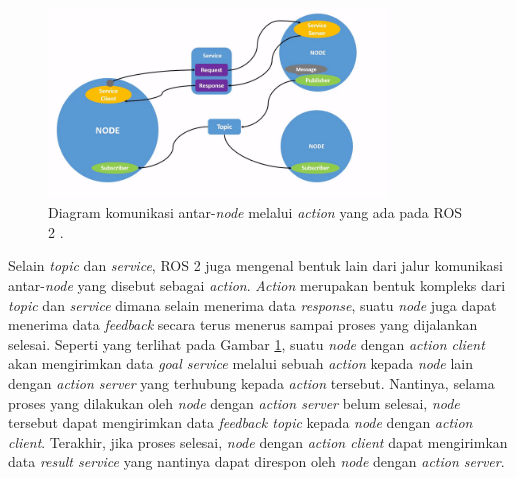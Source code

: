 \begin{figure}
  \centering
  \includegraphics[width=0.8\textwidth,keepaspectratio]{gambar/diagram-action-ros2.png}
  \caption{Diagram komunikasi antar-\emph{node} melalui \emph{action} yang ada pada ROS 2 \citep{url:understandingros2actions}.}
  \label{fig:diagramactionros2}
\end{figure}

Selain \emph{topic} dan \emph{service},
  ROS 2 juga mengenal bentuk lain dari jalur komunikasi antar-\emph{node} yang disebut sebagai \emph{action}.
\emph{Action} merupakan bentuk kompleks dari \emph{topic} dan \emph{service} dimana selain menerima data \emph{response},
  suatu \emph{node} juga dapat menerima data \emph{feedback} secara terus menerus sampai proses yang dijalankan selesai.
Seperti yang terlihat pada Gambar \ref{fig:diagramactionros2},
  suatu \emph{node} dengan \emph{action client} akan mengirimkan data \emph{goal service} melalui sebuah \emph{action} kepada \emph{node} lain dengan \emph{action server} yang terhubung kepada \emph{action} tersebut.
Nantinya, selama proses yang dilakukan oleh \emph{node} dengan \emph{action server} belum selesai,
  \emph{node} tersebut dapat mengirimkan data \emph{feedback topic} kepada \emph{node} dengan \emph{action client}.
Terakhir, jika proses selesai, \emph{node} dengan \emph{action client} dapat mengirimkan data \emph{result service} yang nantinya dapat direspon oleh \emph{node} dengan \emph{action server}.
